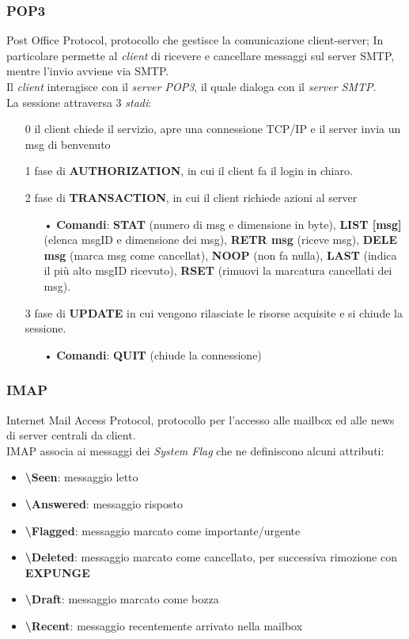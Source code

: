 \documentclass[a4paper,11pt]{article}
\begin{document}
\subsubsection{POP3}
Post Office Protocol, protocollo che gestisce la comunicazione client-server; In particolare permette al \textit{client} di ricevere e cancellare messaggi sul server SMTP, mentre l'invio avviene via SMTP.\\
Il \textit{client} interagisce con il \textit{server POP3}, il quale dialoga con il \textit{server SMTP}.\\
La sessione attraversa 3 \textit{stadi}: 
\begin{itemize}
\item[0] il client chiede il servizio, apre una connessione TCP/IP e il server invia un msg di benvenuto
\item[1] fase di \textbf{AUTHORIZATION}, in cui il client fa il login in chiaro.
\item[2] fase di \textbf{TRANSACTION}, in cui il client richiede azioni al server
\begin{itemize}
\item[•]\textbf{Comandi}: \textbf{STAT} (numero di msg e dimensione in byte), \textbf{LIST [msg]} (elenca msgID e dimensione dei msg), \textbf{RETR msg} (riceve msg), \textbf{DELE msg} (marca msg come cancellat), \textbf{NOOP} (non fa nulla), \textbf{LAST} (indica il più alto msgID ricevuto), \textbf{RSET} (rimuovi la marcatura cancellati dei msg).
\end{itemize}
\item[3] fase di \textbf{UPDATE} in cui vengono rilasciate le risorse acquisite e si chiude la sessione.
\begin{itemize}
\item[•]\textbf{Comandi}: \textbf{QUIT} (chiude la connessione)
\end{itemize}
\end{itemize}
 
 \subsubsection{IMAP}
 Internet Mail Access Protocol, protocollo per l'accesso alle mailbox ed alle news di server centrali da client.\\
 IMAP associa ai messaggi dei \textit{System Flag} che ne definiscono alcuni attributi:
 \begin{itemize}
 \item\textbf{\textbackslash Seen}: messaggio letto
  \item\textbf{\textbackslash Answered}: messaggio risposto
   \item\textbf{\textbackslash Flagged}: messaggio marcato come importante/urgente
    \item\textbf{\textbackslash Deleted}: messaggio marcato come cancellato, per successiva rimozione con \textbf{EXPUNGE}
     \item\textbf{\textbackslash Draft}: messaggio marcato come bozza
      \item\textbf{\textbackslash Recent}: messaggio recentemente arrivato nella mailbox
 \end{itemize}
 
\end{document}
